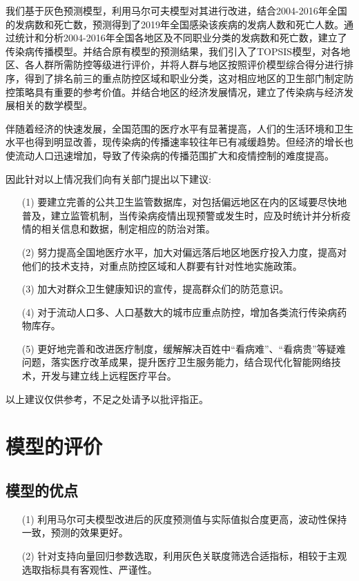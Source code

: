 \documentclass{whutmod}
\begin{document}
  我们基于灰色预测模型，利用马尔可夫模型对其进行改进，结合2004-2016年全国的发病数和死亡数，预测得到了2019年全国感染该疾病的发病人数和死亡人数。通过统计和分析2004-2016年全国各地区及不同职业分类的发病数和死亡数，建立了传染病传播模型。并结合原有模型的预测结果，我们引入了TOPSIS模型，对各地区、各人群所需防控等级进行评价，并将人群与地区按照评价模型综合得分进行排序，得到了排名前三的重点防控区域和职业分类，这对相应地区的卫生部门制定防控策略具有重要的参考价值。并结合地区的经济发展情况，建立了传染病与经济发展相关的数学模型。
  
  伴随着经济的快速发展，全国范围的医疗水平有显著提高，人们的生活环境和卫生水平也得到明显改善，现传染病的传播速率较往年已有减缓趋势。但经济的增长也使流动人口迅速增加，导致了传染病的传播范围扩大和疫情控制的难度提高。 
  
  因此针对以上情况我们向有关部门提出以下建议:
  \begin{itemize}                                             
  	\item [(1)] 要建立完善的公共卫生监管数据库，对包括偏远地区在内的区域要尽快地普及，建立监管机制，当传染病疫情出现预警或发生时，应及时统计并分析疫情的相关信息和数据，制定相应的防治对策。
  	\item[(2)]努力提高全国地医疗水平，加大对偏远落后地区地医疗投入力度，提高对他们的技术支持，对重点防控区域和人群要有针对性地实施政策。
  	\item [(3)]加大对群众卫生健康知识的宣传，提高群众们的防范意识。
  	\item [(4)]对于流动人口多、人口基数大的城市应重点防控，增加各类流行传染病药物库存。
  	\item [(5)]更好地完善和改进医疗制度，缓解解决百姓中“看病难”、“看病贵”等疑难问题，落实医疗改革成果，提升医疗卫生服务能力，结合现代化智能网络技术，开发与建立线上远程医疗平台。	
  \end{itemize}
  以上建议仅供参考，不足之处请予以批评指正。
  
  
  
  \section{模型的评价}
  \subsection{模型的优点}
  \begin{itemize}                                             
  	\item [(1)] 利用马尔可夫模型改进后的灰度预测值与实际值拟合度更高，波动性保持一致，预测的效果更好。
  	\item [(2)] 针对支持向量回归参数选取，利用灰色关联度筛选合适指标，相较于主观选取指标具有客观性、严谨性。	
  \end{itemize}
\end{document}
